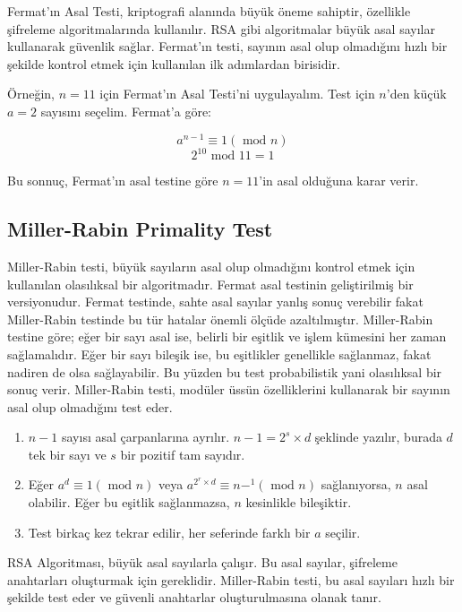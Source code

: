 Fermat’ın Asal Testi, kriptografi alanında büyük öneme sahiptir, özellikle şifreleme algoritmalarında kullanılır. RSA gibi algoritmalar büyük asal sayılar kullanarak güvenlik sağlar. Fermat’ın testi, sayının asal olup olmadığını hızlı bir şekilde kontrol etmek için kullanılan ilk adımlardan birisidir.

Örneğin, $n = 11$ için Fermat'ın Asal Testi'ni uygulayalım. Test için $n$'den küçük $a = 2$ sayısını seçelim. Fermat'a göre:

\[ a^{n-1} \equiv 1 (\text{ mod } n) \]
\[ 2^10 \text{ mod } 11 = 1 \]

Bu sonnuç, Fermat'ın asal testine göre $n = 11$'in asal olduğuna karar verir.

\newpage

\subsection{Miller-Rabin Primality Test}

Miller-Rabin testi, büyük sayıların asal olup olmadığını kontrol etmek için kullanılan olasılıksal bir algoritmadır. Fermat asal testinin geliştirilmiş bir versiyonudur. Fermat testinde, sahte asal sayılar yanlış sonuç verebilir fakat Miller-Rabin testinde bu tür hatalar önemli ölçüde azaltılmıştır. Miller-Rabin testine göre; eğer bir sayı asal ise, belirli bir eşitlik ve işlem kümesini her zaman sağlamalıdır. Eğer bir sayı bileşik ise, bu eşitlikler genellikle sağlanmaz, fakat nadiren de olsa sağlayabilir. Bu yüzden bu test probabilistik yani olasılıksal bir sonuç verir. Miller-Rabin testi, modüler üssün özelliklerini kullanarak bir sayının asal olup olmadığını test eder.

\begin{enumerate}
    \item $n - 1$ sayısı asal çarpanlarına ayrılır. $n - 1 = 2^s \times d$ şeklinde yazılır, burada $d$ tek bir sayı ve $s$ bir pozitif tam sayıdır.
    \item Eğer $a^d \equiv 1 (\text{ mod } n)$ veya $a^{2^r \times d} \equiv n -^1 (\text{ mod } n)$ sağlanıyorsa, $n$ asal olabilir. Eğer bu eşitlik sağlanmazsa, $n$ kesinlikle bileşiktir.
    \item Test birkaç kez tekrar edilir, her seferinde farklı bir $a$ seçilir.
\end{enumerate}

RSA Algoritması, büyük asal sayılarla çalışır. Bu asal sayılar, şifreleme anahtarları oluşturmak için gereklidir. Miller-Rabin testi, bu asal sayıları hızlı bir şekilde test eder ve güvenli anahtarlar oluşturulmasına olanak tanır.

